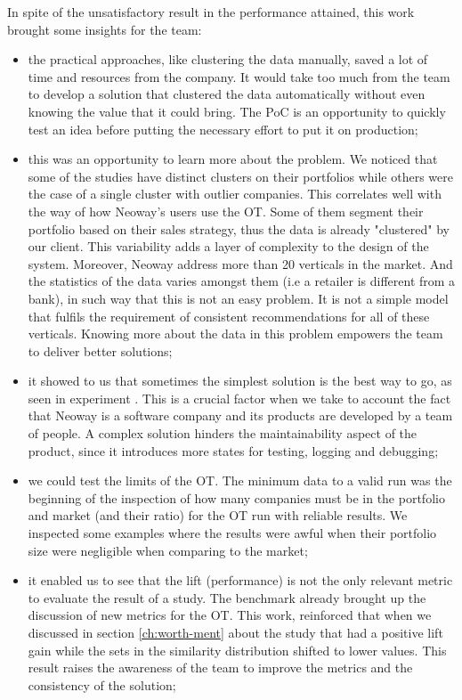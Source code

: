 In spite of the unsatisfactory result in the performance attained, this work brought some insights for the team:
\begin{itemize}
    \item the practical approaches, like clustering the data manually, saved a lot of time and resources from the company. It would take too much from the team to develop a solution that clustered the data automatically without even knowing the value that it could bring. The PoC is an opportunity to quickly test an idea before putting the necessary effort to put it on production;
    \item this was an opportunity to learn more about the problem. We noticed that some of the studies have distinct clusters on their portfolios while others were the case of a single cluster with outlier companies. This correlates well with the way of how Neoway's users use the OT. Some of them segment their portfolio based on their sales strategy, thus the data is already "clustered" by our client. This variability adds a layer of complexity to the design of the system. Moreover, Neoway address more than 20 verticals in the market. And the statistics of the data varies amongst them (i.e a retailer is different from a bank), in such way that this is not an easy problem. It is not a simple model that fulfils the requirement of consistent recommendations for all of these verticals. Knowing more about the data in this problem empowers the team to deliver better solutions;
    \item it showed to us that sometimes the simplest solution is the best way to go, as seen in experiment \nameExperimentII{}. This is a crucial factor when we take to account the fact that Neoway is a software company and its products are developed by a team of people. A complex solution hinders the maintainability aspect of the product, since it introduces more states for testing, logging and debugging;
    \item we could test the limits of the OT. The minimum data to a valid run was the beginning of the inspection of how many companies must be in the portfolio and market (and their ratio) for the OT run with reliable results. We inspected some examples where the results were awful when their portfolio size were negligible when comparing to the market;
    \item it enabled us to see that the lift (performance) is not the only relevant metric to evaluate the result of a study. The benchmark already brought up the discussion of new metrics for the OT. This work, reinforced that when we discussed in section \ref{ch:worth-ment} about the study that had a positive lift gain while the sets in the similarity distribution shifted to lower values. This result raises the awareness of the team to improve the metrics and the consistency of the solution;
\end{itemize}

